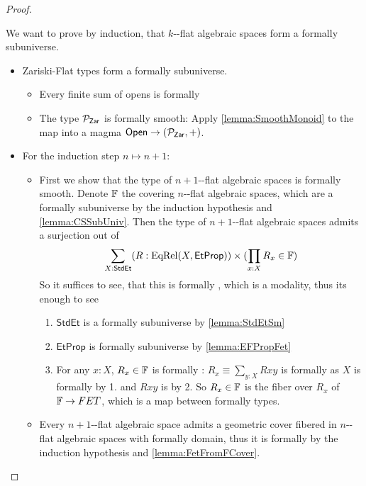 \begin{proof}
\begin{itemize}
\begin{enumerate}
		\end{enumerate}
		We want to prove by induction, that $k$-\etale-flat algebraic spaces form a formally \etale subuniverse.
		\begin{itemize}
			\item  Zariski-Flat types form a formally \etale subuniverse. 
			\begin{itemize}
				\item Every finite sum of opens is formally \etale
				\item The type $\mathcal{P}_{\mathsf{Zar}}$ is formally smooth: Apply \ref{lemma:SmoothMonoid} to the map into a magma $\mathsf{Open}  \to (\mathcal{P}_{\mathsf{Zar}}, +)$.
				
			\end{itemize}
			\item For the induction step $n \mapsto n+1$:
			\begin{itemize}
				\item 	First we show that the type of $n+1$-\etale-flat algebraic spaces is formally smooth. Denote $\mathbb{F}$ the covering $n$-\etale-flat algebraic spaces, which are a formally \etale subuniverse by the induction hypothesis and \ref{lemma:CSSubUniv}. Then the type of $n+1$-\etale-flat algebraic spaces admits a surjection out of 
				\[\sum_{X: \mathsf{StdEt}} (R : \mathrm{EqRel}(X  , \mathsf{EtProp})) \times (\prod_{x : X} R_x \in \mathbb{F}) \]
				So it suffices to see, that this is formally \etale, which is a modality, thus its enough to see
					\begin{enumerate}
						\item $\mathsf{StdEt}$ is a formally \etale subuniverse by \ref{lemma:StdEtSm}
						\item $\mathsf{EtProp}$ is formally \etale subuniverse by \ref{lemma:EFPropFet}
						\item For any $x : X$, $R_x \in \mathbb{F}$ is formally \etale: $R_x \equiv \sum_{y:X} R x y$ is formally \etale as $X$ is formally \etale by 1. and $R x y$ is by 2. So $R_x \in \mathbb{F}$ is the fiber over $R_x$ of $\mathbb{F} \to FET$, which is a map between formally \etale types.
					\end{enumerate}
				\item Every $n+1$-\etale-flat algebraic space admits a geometric cover fibered in $n$-\etale-flat algebraic spaces with formally \etale domain, thus it is formally \etale by the induction hypothesis and \ref{lemma:FetFromFCover}.
			\end{itemize}

\end{itemize}
\end{itemize}
\end{proof}
